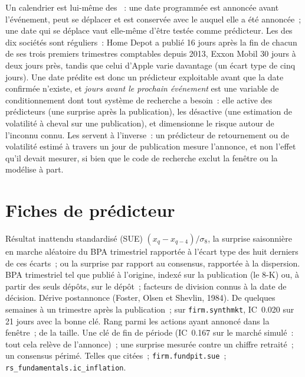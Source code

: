Un calendrier est lui-même des ~: une date programmée est annoncée avant l'événement, peut se déplacer et est conservée avec le  auquel elle a été annoncée~; une date qui se déplace vaut elle-même d'être testée comme prédicteur. Les  des dix sociétés sont réguliers~: Home Depot a publié
16 jours après la fin de chacun de ses trois premiers trimestres comptables depuis 2013, Exxon Mobil 30 jours à deux jours près, tandis que celui d'Apple varie davantage (un écart type de cinq jours). Une date prédite est donc un prédicteur exploitable avant que la
date confirmée n'existe, et \emph{jours avant le prochain événement} est une variable de conditionnement dont tout système de recherche a besoin~: elle
active des prédicteurs (une surprise après la publication), les désactive (une estimation de volatilité à cheval sur une publication), et dimensionne le risque autour de l'inconnu connu.
Les  servent à l'inverse~: un prédicteur de retournement ou de volatilité estimé à travers un jour de publication mesure l'annonce,
et non l'effet qu'il devait mesurer, si bien que le code de recherche exclut la fenêtre ou la modélise à part.

\section{Fiches de prédicteur}

\begin{predictorcard}{Résultat inattendu standardisé (SUE)}\label{pred:rs:fundamental-analyst-and-event-features:sue}
 $(x_q - x_{q-4})/\sigma_8$, la surprise saisonnière en marche aléatoire du BPA trimestriel rapportée à l'écart type des
huit derniers de ces écarts~; ou la surprise par rapport au consensus, rapportée à la dispersion.
 BPA trimestriel tel que publié à l'origine, indexé sur la publication (le 8-K) ou, à partir des seuls dépôts, sur le dépôt~; facteurs de division
connus à la date de décision.
 Dérive postannonce (Foster, Olsen et Shevlin, 1984).
 De quelques semaines à un trimestre après la publication~; sur \texttt{firm.synthmkt}, IC~0.020 sur 21 jours avec la bonne clé.
 Rang parmi les actions ayant annoncé dans la fenêtre~;  de la taille.
 Une clé de fin de période (IC~0.167 sur le marché simulé~: tout cela relève de l'annonce)~; une surprise mesurée contre un chiffre
retraité~; un consensus périmé.
 Telles que citées~; \texttt{firm.fundpit.sue}~; \texttt{rs\_fundamentals.ic\_inflation}.
\end{predictorcard}

